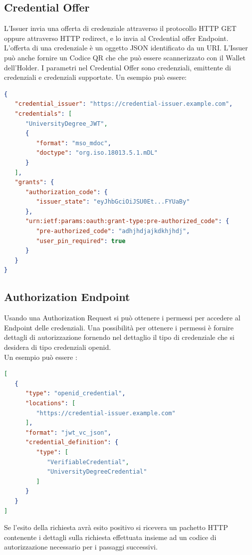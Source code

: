 \subsection{Credential Offer}


L'Issuer invia una offerta di credenziale attraverso il protocollo HTTP GET oppure attraverso HTTP redirect, e lo invia al Credential offer Endpoint.
L'offerta di una credenziale è un oggetto JSON identificato da un URI.
L'Issuer può anche fornire un Codice QR che che può essere scannerizzato con il Wallet dell'Holder.
I parametri nel Credential Offer sono credenziali, emittente di credenziali e credenziali supportate.
Un esempio può essere:
\begin{lstlisting}[language=json,firstnumber=1]
{
   "credential_issuer": "https://credential-issuer.example.com",
   "credentials": [
      "UniversityDegree_JWT",
      {
         "format": "mso_mdoc",
         "doctype": "org.iso.18013.5.1.mDL"
      }
   ],
   "grants": {
      "authorization_code": {
         "issuer_state": "eyJhbGciOiJSU0Et...FYUaBy"
      },
      "urn:ietf:params:oauth:grant-type:pre-authorized_code": {
         "pre-authorized_code": "adhjhdjajkdkhjhdj",
         "user_pin_required": true
      }
   }
}
\end{lstlisting}

\subsection{Authorization Endpoint}
Usando una Authorization Request si può ottenere i permessi per accedere al Endpoint delle credenziali.
Una possibilità per ottenere i permessi è fornire dettagli di autorizzazione fornendo nel dettaglio il tipo di credenziale che si desidera
di tipo credenziali openid.\\
Un esempio può essere :
\begin{lstlisting}[language=json,firstnumber=1]
[
   {
      "type": "openid_credential",
      "locations": [
         "https://credential-issuer.example.com"
      ],
      "format": "jwt_vc_json",
      "credential_definition": {
         "type": [
            "VerifiableCredential",
            "UniversityDegreeCredential"
         ]
      }
   }
]
\end{lstlisting}
Se l'esito della richiesta avrà esito positivo si ricevera un pachetto HTTP contenente i dettagli sulla 
richiesta effettuata insieme ad un codice di autorizzazione necessario per i passaggi successivi.
